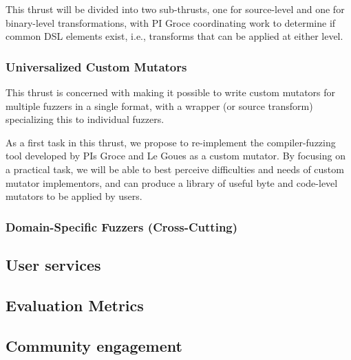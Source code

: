 This thrust will be divided into two sub-thrusts, one for source-level and one 
for binary-level transformations, with PI Groce coordinating work to determine 
if common DSL elements exist, i.e., transforms that can be applied at either 
level.

\subsubsection{Universalized Custom Mutators}

This thrust is concerned with making it possible to write custom mutators for 
multiple fuzzers in a single format, with a wrapper (or source transform) 
specializing this to individual fuzzers.

As a first task in this thrust, we propose to re-implement the compiler-fuzzing 
tool developed by PIs Groce and Le Goues as a custom mutator.  By focusing on a 
practical task, we will be able to best perceive difficulties and needs of 
custom mutator implementors, and can produce a library of useful byte and 
code-level mutators to be applied by users.

\subsubsection{Domain-Specific Fuzzers (Cross-Cutting)}

\subsection{User services}
\label{sec:user-services}


\subsection{Evaluation Metrics}



\subsection{Community engagement}


